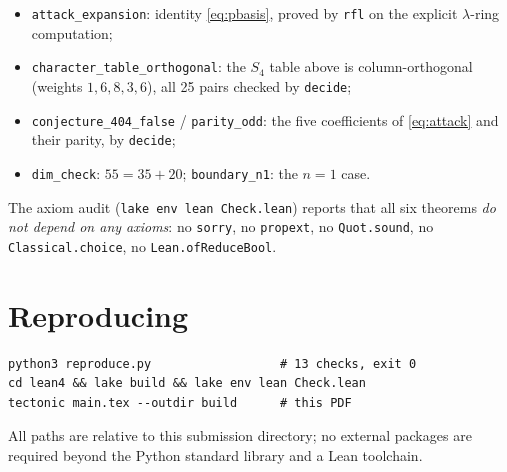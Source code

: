\documentclass[11pt]{article}
\theoremstyle{plain}
\begin{document}
\begin{itemize}
\item \texttt{attack\_expansion}: identity \eqref{eq:pbasis}, proved by
\texttt{rfl} on the explicit $\lambda$-ring computation;
\item \texttt{character\_table\_orthogonal}: the $S_4$ table above is
column-orthogonal (weights $1,6,8,3,6$), all 25 pairs checked by
\texttt{decide};
\item \texttt{conjecture\_404\_false} / \texttt{parity\_odd}: the five
coefficients of \eqref{eq:attack} and their parity, by \texttt{decide};
\item \texttt{dim\_check}: $55 = 35 + 20$; \quad
\texttt{boundary\_n1}: the $n=1$ case.
\end{itemize}

The axiom audit (\texttt{lake env lean Check.lean}) reports that all six
theorems \emph{do not depend on any axioms}: no \texttt{sorry}, no
\texttt{propext}, no \texttt{Quot.sound}, no \texttt{Classical.choice}, no
\texttt{Lean.ofReduceBool}.

\section{Reproducing}

\begin{verbatim}
python3 reproduce.py                  # 13 checks, exit 0
cd lean4 && lake build && lake env lean Check.lean
tectonic main.tex --outdir build      # this PDF
\end{verbatim}
All paths are relative to this submission directory; no external packages
are required beyond the Python standard library and a Lean toolchain.
\end{document}
